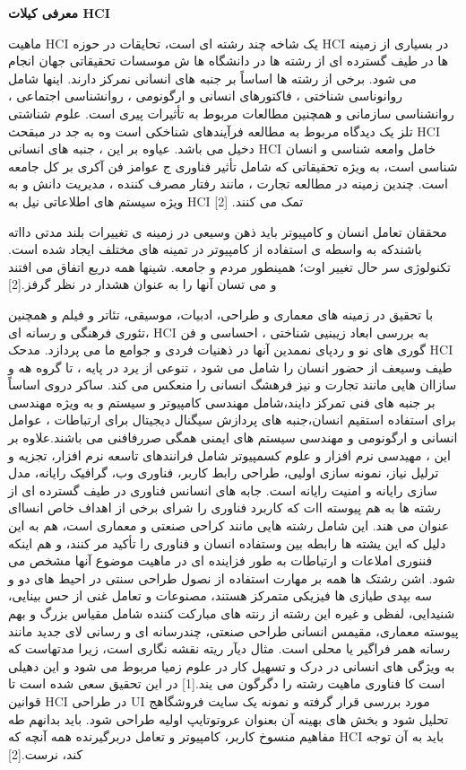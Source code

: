 \documentclass[13pt]{article}
\begin{document}
\textbf{{\large معرفی کیلات HCI}}

ماهیت  HCI یک شاخه چند رشته ای است، تحایقات در حوزه  HCI در بسیاری از زمینه ها
در طیف گسترده ای از رشته ها در دانشگاه ها ش موسسات تحقیقاتی جهان  انجام می شود.
برخی از رشته ها اساساً بر جنبه های انسانی نمرکز دارند. اینها شامل روانوناسی
شناختی ، فاکتورهای انسانی و ارگونومی ، روانشناسی اجتماعی ، روانشناسی سازمانی و
همچنین مطالعات مربوط به تأثیرات پیری است. علوم شناشتی تلز یک دیدگاه مربوط به
مطالعه فرآیندهای شناخکی است وه به جد در مبقحث HCI دخیل می باشد. عیاوه  بر این ،
جنبه های انسانی HCI خامل وامعه شناسی و انسان شناسی است، به ویژه تحقیقاتی که شامل
تأثیر فناوری ج عوامز فن آکری بر کل جامعه است. چندین زمینه در مطالعه تجارت ، مانند
رفتار مصرف کننده ، مدیریت دانش و به ویژه سیستم های اطلاعاتی نیل به HCI تمک می
کنند. [2]

محققان تعامل انسان و کامپیوتر باید ذهن وسیعی در زمینه ی تغییرات بلند مدتی دااته
باشندکه به واسطه ی استفاده از کامپیوتر در تمینه های مختلف ایجاد شده است. تکنولوژی
سر حال تغییر اوت؛ همینطور مردم و جامعه. شینها همه دریع اتفاق می افتند و می تسان
آنها را به عنوان هشدار در نظر گرفز.[2]

با تحقیق در زمینه های معماری و طراحی، ادبیات، موسیقی، تئاتر و فیلم و همچنین
تئوری فرهنگی و رسانه ای، HCI  به بررسی ابعاد زیبنیی شناختی ، احساسی و فن گوری های
نو و ردپای نممدین آنها در ذهنیات فردی و جوامع ما می پردازد. مدحک HCI طیف وسیعف از
حضور انسان را شامل می شود ، تنوعی از یرد در پایه ، تا گروه هه و سازاان هایی مانند
تجارت و نیز فرهشگ انسانی را منعکس می کند. ساکر دروی اساساً بر جنبه های فنی تمرکز
دایند،شامل مهندسی کامپیوتر و سیستم و به ویژه مهندسی برای استفاده استقیم
انسان،جنبه های پردازش سیگنال دیجیتال برای ارتباطات ، عوامل انسانی و ارگونومی و
مهندسی سیستم های ایمنی همگی صررفافنی می باشند.علاوه بر این ، مهیدسی نرم افزار و
علوم کسمپیوتر شامل فرانندهای تاسعه نرم افزار، تجزیه و ترلیل نیاز، نمونه سازی
اولیی، طراحی رابط کاربر، فناوری وب، گرافیک رایانه، مدل سازی رایانه و امنیت رایانه
است. جابه های انسانس فناوری در طیف گسترده ای از رشته ها به هم پیوسته اات که
کاربرد فناوری را شرای برخی از اهداف خاص انساای عنوان می هند. این شامل رشته هایی
مانند کراحی صنعتی و معماری است، هم به این دلیل که این یشته ها رابطه بین وستفاده
انسان و فناوری را تأکید مر کنند، و هم اینکه فننوری املاعات و ارتباطات به طور
فزاینده ای در ماهیت موضوع آنها مشخص می شود. اشن رشتک ها همه بر مهارت استفاده از
نصول طراحی سنتی در احیط های دو و سه بپدی طیازی ها فیزیکی متمرکز هستند، مصنوعات و
تعامل غنی از حس بینایی، شنیدایی، لفظی و غیره این رشته از رنته های مبارکت کننده
شامل مقیاس بزرگ و بهم پیوسته معماری، مقیمس انسانی طراحی صنعتی، چندرسانه ای و
رسانی لای جدید مانند رسانه همر فراگیر یا محلی است. مثال دیآر ریته نقشه نگاری است،
زیرا مدتهاست که به ویژگی های انسانی در درک و تسهیل کار در علوم زمیا مربوط می شود
و این دهیلی است کا فناوری ماهیت رشته را دگرگون می یند.[1] در این تحقیق سعی شده
است تا قوانین HCI در طراحی UI مورد بررسی قرار گرفته و نمونه یک سایت فروشگاهج
تحلیل شود و بخش های بهینه آن بعنوان عروتوتایپ اولیه طراحی شود. باید بدانهم طه
مفاهیم منسوخ \guillemotleft{}کاربر\guillemotright{}،
\guillemotleft{}کامپیوتر\guillemotright{} و
\guillemotleft{}تعامل\guillemotright{} دربرگیرنده همه آنچه که HCI باید به آن توجه
کند، نرست.[2]
\end{document}
